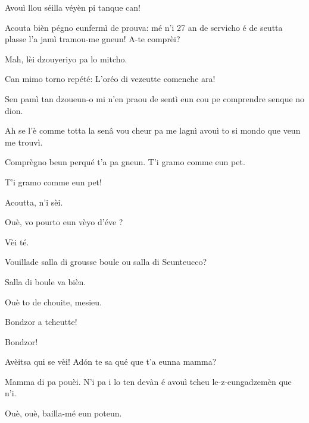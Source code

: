 \begin{drama}
\Eunfeurmispeaks {} Avouì llou séilla véyèn pi tan\-que can!

\Eunfeurmiespeaks Acouta bièn pégno eunfermì de prouva: mé n'i 27 an de servicho é de seutta plasse l’a jamì tramou-me gneun! A-te comprèi?

\Eunfeurmispeaks Mah, lèi dzouyeriyo pa lo mitcho.

\Eunfeurmiespeaks Can mimo torno repété:  L’oréo di vezeutte comenche ara!


\Gerominespeaks Sen pamì tan dzoueun-o mi n’en praou de sentì eun cou pe comprendre senque no dion.

\Casimirspeaks Ah se l’è comme totta la senâ vou cheur pa me lagnì avouì to si mondo que veun me trouvì.

\Gerominespeaks Comprègno beun perqué t’a pa gneun. T’i gramo com\-me eun pet.

\Casimirspeaks {} T'i gramo comme eun pet!

\PersEmpourtantaspeaks {} Acoutta, n’i sèi.

\Eunfeurmispeaks Ouè,  vo pourto eun vèyo d'éve \bicchiere ?

\PersEmpourtantaspeaks Vèi té.

\Eunfeurmispeaks Vouillade salla di grousse boule ou salla di Seunteucco?

\PersEmpourtantaspeaks Salla di boule va bièn.

\Eunfeurmispeaks Ouè to de chouite, mesieu.


\Feliespeaks Bondzor a tcheutte!

\Casimirspeaks {} Bondzor!

\Gerominespeaks Avèitsa qui se vèi! Ad\'on te sa qué que t’a eunna mamma?

\Feliespeaks Mamma di pa pouèi. N’i pa i lo ten devàn é avouì tcheu le-z-eungadzemèn que n'i.

\Gerominespeaks Ouè, ouè, bailla-mé eun poteun.



\end{drama}
